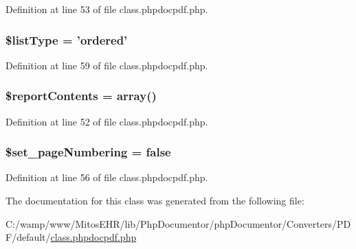 \-Definition at line 53 of file class.\-phpdocpdf.\-php.

\hypertarget{classphpdocpdf_a21422b75c7f496639082da4a1e327a64}{
\subsubsection[{\$list\-Type}]{\setlength{\rightskip}{0pt plus 5cm}\$list\-Type = 'ordered'}}\label{classphpdocpdf_a21422b75c7f496639082da4a1e327a64}


\-Definition at line 59 of file class.\-phpdocpdf.\-php.

\hypertarget{classphpdocpdf_ad3005b139ad3402ca55acbbccb0e01c8}{
\subsubsection[{\$report\-Contents}]{\setlength{\rightskip}{0pt plus 5cm}\$report\-Contents = array()}}\label{classphpdocpdf_ad3005b139ad3402ca55acbbccb0e01c8}


\-Definition at line 52 of file class.\-phpdocpdf.\-php.

\hypertarget{classphpdocpdf_ae4b30f7632b21804105d7c41da264747}{
\subsubsection[{\$set\-\_\-page\-Numbering}]{\setlength{\rightskip}{0pt plus 5cm}\$set\-\_\-page\-Numbering = false}}\label{classphpdocpdf_ae4b30f7632b21804105d7c41da264747}


\-Definition at line 56 of file class.\-phpdocpdf.\-php.



\-The documentation for this class was generated from the following file\-:\begin{DoxyCompactItemize}
\item 
\-C\-:/wamp/www/\-Mitos\-E\-H\-R/lib/\-Php\-Documentor/php\-Documentor/\-Converters/\-P\-D\-F/default/\hyperlink{class_8phpdocpdf_8php}{class.\-phpdocpdf.\-php}\end{DoxyCompactItemize}

